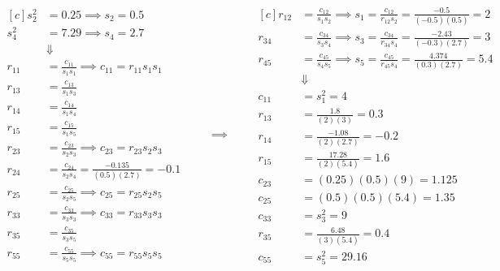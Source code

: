 \documentclass[onecolumn,10pt]{jhwhw}
\begin{document}
\begin{equation*}
\begin{aligned}[c]
s_{2}^2 &=0.25 \implies s_2 = 0.5 \\
s_{4}^2 &=7.29 \implies s_4 = 2.7 \\
& \Downarrow \\
r_{11} &= \frac{c_{11}}{s_1 s_1} \implies c_{11} = r_{11} s_{1} s_{1}\\
r_{13} &= \frac{c_{13}}{s_1 s_3} \\
r_{14} &= \frac{c_{14}}{s_1 s_4} \\
r_{15} &= \frac{c_{15}}{s_1 s_5} \\
r_{23} &= \frac{c_{23}}{s_2 s_3} \implies c_{23} = r_{23} s_{2} s_{3}\\
r_{24} &= \frac{c_{24}}{s_2 s_4} = \frac{-0.135}{(0.5)(2.7)} = -0.1\\
r_{25} &= \frac{c_{25}}{s_2 s_5} \implies c_{25} = r_{25} s_{2} s_{5}\\
r_{33} &= \frac{c_{33}}{s_3 s_3} \implies c_{33} = r_{33} s_{3} s_{3}\\
r_{35} &= \frac{c_{35}}{s_3 s_5} \\
r_{55} &= \frac{c_{55}}{s_5 s_5} \implies c_{55} = r_{55} s_{5} s_{5}
\end{aligned}
\qquad\implies\qquad
\begin{aligned}[c]
r_{12} &= \frac{c_{12}}{s_1 s_2} \implies s_1 = \frac{c_{12}}{r_{12} s_2} = \frac{-0.5}{(-0.5)(0.5)} = 2\\
r_{34} &= \frac{c_{34}}{s_3 s_4} \implies s_3 = \frac{c_{34}}{r_{34} s_4} = \frac{-2.43}{(-0.3)(2.7)} = 3\\
r_{45} &= \frac{c_{45}}{s_4 s_5} \implies s_5 = \frac{c_{45}}{r_{45} s_4} = \frac{4.374}{(0.3)(2.7)} = 5.4\\
& \Downarrow \\
c_{11} &= s_{1}^2 = 4\\
r_{13} &= \frac{1.8}{(2) (3)} = 0.3 \\
r_{14} &= \frac{-1.08}{(2) (2.7)} = -0.2 \\
r_{15} &= \frac{17.28}{(2) (5.4)} = 1.6\\
c_{23} &= (0.25) (0.5) (9) = 1.125\\
c_{25} &= (0.5) (0.5) (5.4) = 1.35\\
c_{33} &= s_{3}^2 = 9\\
r_{35} &= \frac{6.48}{(3) (5.4)} =0.4\\
c_{55} &= s_{5}^2 = 29.16
\end{aligned}
\end{equation*}
\end{document}
